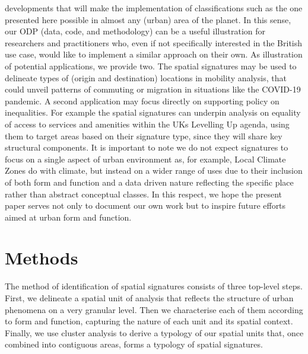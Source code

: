 \documentclass[fleqn,10pt]{wlscirep}
\begin{document}
developments that will make the implementation of classifications such as the
one presented here possible in almost any (urban) area of the planet.
In this sense, our ODP (data, code, and methodology) can be a useful illustration for researchers and practitioners who, even if not
specifically interested in the British use case, would like to implement a similar
approach on their own.
As illustration of potential applications, we provide two. The spatial
signatures may be used to delineate types of
(origin and destination) locations in mobility analysis, that could unveil patterns
of commuting or migration in situations like the COVID-19 pandemic. A second
application may focus directly on supporting policy on inequalities. For
example the spatial signatures can underpin analysis on equality of access
to services and amenities within the UKs Levelling Up
agenda\cite{luwp22}, using them to target
areas based on their signature type, since they will share key structural
components. It is important to note we do not expect signatures to focus on a single
aspect of urban environment as, for example, Local Climate Zones \cite{stewart2012local}
do with climate, but instead on a wider range of
uses due to their inclusion of both form and function and a data driven nature reflecting
the specific place rather than abstract conceptual classes.
In this respect, we hope the present paper serves not only to document our own
work but to inspire future efforts aimed at urban form and function.
\section*{Methods}
The method of identification of spatial signatures consists of three top-level steps.
First, we delineate a spatial unit of analysis that reflects the structure of
urban phenomena on a very granular level. Then we characterise each of them
according to form and function, capturing the nature of each unit and its spatial
context. Finally, we use cluster analysis to derive a typology of our spatial units
that, once combined into contiguous areas, forms a typology of spatial signatures.
\end{document}
